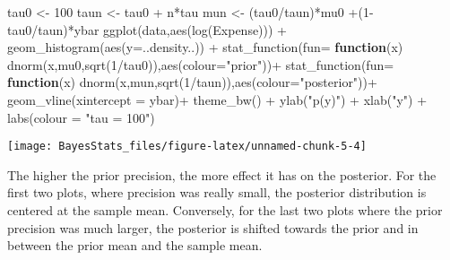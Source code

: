 \documentclass[
]{book}
\newenvironment{Shaded}{\begin{snugshade}}{\end{snugshade}}
\newcommand{\AttributeTok}[1]{\textcolor[rgb]{0.77,0.63,0.00}{#1}}
\newcommand{\ControlFlowTok}[1]{\textcolor[rgb]{0.13,0.29,0.53}{\textbf{#1}}}
\newcommand{\DecValTok}[1]{\textcolor[rgb]{0.00,0.00,0.81}{#1}}
\newcommand{\FunctionTok}[1]{\textcolor[rgb]{0.00,0.00,0.00}{#1}}
\newcommand{\NormalTok}[1]{#1}
\newcommand{\OtherTok}[1]{\textcolor[rgb]{0.56,0.35,0.01}{#1}}
\newcommand{\SpecialCharTok}[1]{\textcolor[rgb]{0.00,0.00,0.00}{#1}}
\newcommand{\StringTok}[1]{\textcolor[rgb]{0.31,0.60,0.02}{#1}}
\begin{document}
\begin{Shaded}
\begin{Highlighting}[]
\NormalTok{tau0 }\OtherTok{\textless{}{-}} \DecValTok{100}
\NormalTok{taun }\OtherTok{\textless{}{-}}\NormalTok{ tau0 }\SpecialCharTok{+}\NormalTok{ n}\SpecialCharTok{*}\NormalTok{tau}
\NormalTok{mun }\OtherTok{\textless{}{-}}\NormalTok{ (tau0}\SpecialCharTok{/}\NormalTok{taun)}\SpecialCharTok{*}\NormalTok{mu0 }\SpecialCharTok{+}\NormalTok{(}\DecValTok{1}\SpecialCharTok{{-}}\NormalTok{tau0}\SpecialCharTok{/}\NormalTok{taun)}\SpecialCharTok{*}\NormalTok{ybar}
\FunctionTok{ggplot}\NormalTok{(data,}\FunctionTok{aes}\NormalTok{(}\FunctionTok{log}\NormalTok{(Expense))) }\SpecialCharTok{+}
  \FunctionTok{geom\_histogram}\NormalTok{(}\FunctionTok{aes}\NormalTok{(}\AttributeTok{y=}\NormalTok{..density..)) }\SpecialCharTok{+}
  \FunctionTok{stat\_function}\NormalTok{(}\AttributeTok{fun=} \ControlFlowTok{function}\NormalTok{(x) }\FunctionTok{dnorm}\NormalTok{(x,mu0,}\FunctionTok{sqrt}\NormalTok{(}\DecValTok{1}\SpecialCharTok{/}\NormalTok{tau0)),}\FunctionTok{aes}\NormalTok{(}\AttributeTok{colour=}\StringTok{"prior"}\NormalTok{))}\SpecialCharTok{+}
  \FunctionTok{stat\_function}\NormalTok{(}\AttributeTok{fun=} \ControlFlowTok{function}\NormalTok{(x) }\FunctionTok{dnorm}\NormalTok{(x,mun,}\FunctionTok{sqrt}\NormalTok{(}\DecValTok{1}\SpecialCharTok{/}\NormalTok{taun)),}\FunctionTok{aes}\NormalTok{(}\AttributeTok{colour=}\StringTok{"posterior"}\NormalTok{))}\SpecialCharTok{+}
  \FunctionTok{geom\_vline}\NormalTok{(}\AttributeTok{xintercept =}\NormalTok{ ybar)}\SpecialCharTok{+}
  \FunctionTok{theme\_bw}\NormalTok{() }\SpecialCharTok{+} \FunctionTok{ylab}\NormalTok{(}\StringTok{"p(y)"}\NormalTok{) }\SpecialCharTok{+} \FunctionTok{xlab}\NormalTok{(}\StringTok{"y"}\NormalTok{) }\SpecialCharTok{+} \FunctionTok{labs}\NormalTok{(}\AttributeTok{colour =} \StringTok{"tau = 100"}\NormalTok{)}
\end{Highlighting}
\end{Shaded}

\begin{center}\texttt{[image: BayesStats\_files/figure-latex/unnamed-chunk-5-4]} \end{center}

The higher the prior precision, the more effect it has on the posterior. For the first two plots, where precision was really small, the posterior distribution is centered at the sample mean. Conversely, for the last two plots where the prior precision was much larger, the posterior is shifted towards the prior and in between the prior mean and the sample mean.
\end{document}
